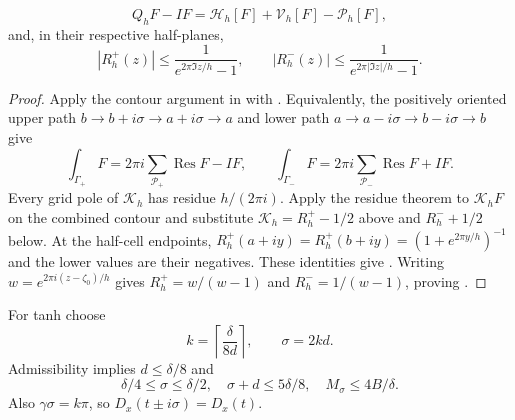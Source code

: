 \begin{lemma}
\label{lem:midpoint}
\begin{equation}
 Q_hF-IF=\mathcal H_h[F]+\mathcal V_h[F]-\mathcal P_h[F],
 \label{eq:midpoint}
\end{equation}
and, in their respective half-planes,
\begin{equation}
 |R_h^+(z)|\le\frac1{e^{2\pi\Im z/h}-1},\qquad
 |R_h^-(z)|\le\frac1{e^{2\pi|\Im z|/h}-1}.
 \label{eq:Rbounds}
\end{equation}
\end{lemma}
\begin{proof}
Apply the contour argument in \cite[Secs.~4--5]{JavedTrefethen2014} with
. Equivalently, the positively oriented upper
path $b\to b+i\sigma\to a+i\sigma\to a$ and lower path
$a\to a-i\sigma\to b-i\sigma\to b$ give
\[
 \int_{\Gamma_+}F=2\pi i\sum_{\mathcal P_+}\operatorname{Res}F-IF,
 \qquad
 \int_{\Gamma_-}F=2\pi i\sum_{\mathcal P_-}\operatorname{Res}F+IF.
\]
Every grid pole of $\mathcal K_h$ has residue $h/(2\pi i)$. Apply the residue
theorem to $\mathcal K_hF$ on the combined contour and substitute
$\mathcal K_h=R_h^+-1/2$ above and $R_h^-+1/2$ below. At the half-cell
endpoints, $R_h^+(a+iy)=R_h^+(b+iy)=(1+e^{2\pi y/h})^{-1}$ and the lower
values are their negatives. These identities give .
Writing $w=e^{2\pi i(z-\zeta_0)/h}$ gives $R_h^+=w/(w-1)$ and
$R_h^-=1/(w-1)$, proving .
\end{proof}
For tanh choose
\begin{equation}
 k=\left\lceil\frac\delta{8d}\right\rceil,\qquad \sigma=2kd.
 \label{eq:sigmachoice}
\end{equation}
Admissibility implies $d\le\delta/8$ and
\begin{equation}
 \delta/4\le\sigma\le\delta/2,\quad
 \sigma+d\le5\delta/8,\quad M_\sigma\le4B/\delta.
 \label{eq:sigmaprops}
\end{equation}
Also $\gamma\sigma=k\pi$, so $D_x(t\pm i\sigma)=D_x(t)$.


